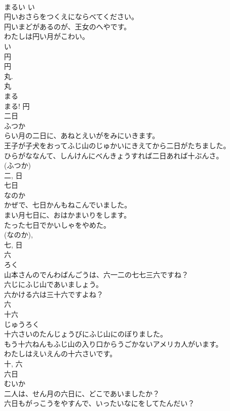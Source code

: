 \documentclass[8pt]{extreport}
\begin{document}
\begin{CJK}{UTF8}{min}
\\	まるい	い 
\\	円いおさらをつくえにならべてください。	
\\	円いまどがあるのが、王女のへやです。	
\\	わたしは円い月がこわい。	
\\	い 
\\	円 
\\	円 
\\	丸. 
\\	丸 
\\	まる 
\\	まる!	円	
\\	二日	
\\	ふつか	
\\	らい月の二日に、あねとえいがをみにいきます。	
\\	王子が子犬をおってふじ山のじゅかいにきえてから二日がたちました。	
\\	ひらがななんて、しんけんにべんきょうすれば二日あれば十ぶんさ。	
\\	(ふつか) 
\\	二, 日	
\\	七日	
\\	なのか	
\\	かぜで、七日かんもねこんでいました。	
\\	まい月七日に、おはかまいりをします。	
\\	たった七日でかいしゃをやめた。	
\\	(なのか), 
\\	七, 日	
\\	六	
\\	ろく	
\\	山本さんのでんわばんごうは、六一二の七七三六ですね？	
\\	六じにふじ山であいましょう。	
\\	六かける六は三十六ですよね？	
\\	六	
\\	十六	
\\	じゅうろく	
\\	十六さいのたんじょうびにふじ山にのぼりました。	
\\	もう十六ねんもふじ山の入り口からうごかないアメリカ人がいます。	
\\	わたしはえいえんの十六さいです。	
\\	十, 六	
\\	六日	
\\	むいか	
\\	二人は、せん月の六日に、どこであいましたか？	
\\	六日もがっこうをやすんで、いったいなにをしてたんだい？	

\end{CJK}
\end{document}
